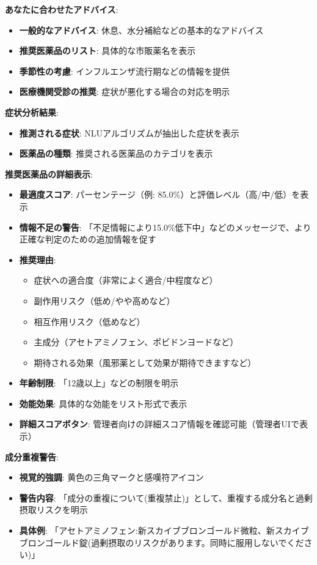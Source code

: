 \documentclass[a4paper,11pt,ja=standard,xelatex]{bxjsarticle}
\theoremstyle{definition}
\begin{document}
\textbf{あなたに合わせたアドバイス}:
\begin{itemize}
\item \textbf{一般的なアドバイス}: 休息、水分補給などの基本的なアドバイス
\item \textbf{推奨医薬品のリスト}: 具体的な市販薬名を表示
\item \textbf{季節性の考慮}: インフルエンザ流行期などの情報を提供
\item \textbf{医療機関受診の推奨}: 症状が悪化する場合の対応を明示
\end{itemize}

\textbf{症状分析結果}:
\begin{itemize}
\item \textbf{推測される症状}: NLUアルゴリズムが抽出した症状を表示
\item \textbf{医薬品の種類}: 推奨される医薬品のカテゴリを表示
\end{itemize}

\textbf{推奨医薬品の詳細表示}:
\begin{itemize}
\item \textbf{最適度スコア}: パーセンテージ（例: 85.0\%）と評価レベル（高/中/低）を表示
\item \textbf{情報不足の警告}: 「不足情報により15.0\%低下中」などのメッセージで、より正確な判定のための追加情報を促す
\item \textbf{推奨理由}: 
  \begin{itemize}
  \item 症状への適合度（非常によく適合/中程度など）
  \item 副作用リスク（低め/やや高めなど）
  \item 相互作用リスク（低めなど）
  \item 主成分（アセトアミノフェン、ポビドンヨードなど）
  \item 期待される効果（風邪薬として効果が期待できますなど）
  \end{itemize}
\item \textbf{年齢制限}: 「12歳以上」などの制限を明示
\item \textbf{効能効果}: 具体的な効能をリスト形式で表示
\item \textbf{詳細スコアボタン}: 管理者向けの詳細スコア情報を確認可能（管理者UIで表示）
\end{itemize}

\textbf{成分重複警告}:
\begin{itemize}
\item \textbf{視覚的強調}: 黄色の三角マークと感嘆符アイコン
\item \textbf{警告内容}: 「成分の重複について(重複禁止)」として、重複する成分名と過剰摂取リスクを明示
\item \textbf{具体例}: 「アセトアミノフェン:新スカイブブロンゴールド微粒、新スカイブブロンゴールド錠(過剰摂取のリスクがあります。同時に服用しないでください)」
\end{itemize}
\end{document}
